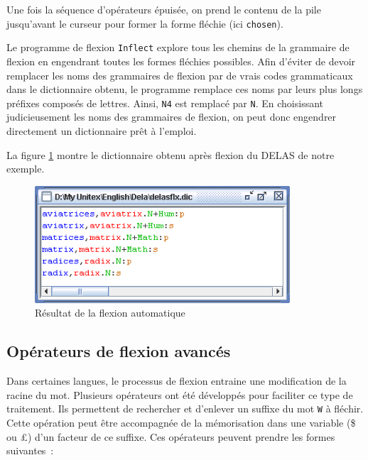 \bigskip
\noindent Une fois la séquence d’opérateurs épuisée, on prend le contenu de la pile jusqu’avant le
curseur pour former la forme fléchie (ici \verb+chosen+).

\bigskip
\noindent Le programme de flexion \verb+Inflect+ explore tous les chemins de la grammaire de flexion
en engendrant toutes les formes fléchies possibles. Afin d’éviter de devoir remplacer les noms des
grammaires de flexion par de vrais codes grammaticaux dans le dictionnaire obtenu, le programme
remplace ces noms par leurs plus longs préfixes composés de lettres. Ainsi, \verb+N4+ est remplacé
par \verb+N+. En choisissant judicieusement les noms des grammaires de flexion, on peut donc
engendrer directement un dictionnaire prêt à l’emploi.

\bigskip
\noindent La figure \ref{fig-inflection-result} montre le dictionnaire obtenu après flexion du DELAS de notre exemple.

\bigskip
\begin{figure}[!ht]
\begin{center}
\includegraphics[width=9.5cm]{resources/img/fig3-9.png}
\caption{Résultat de la flexion automatique\label{fig-inflection-result}}
\end{center}
\end{figure}
\bigskip

\subsection{Opérateurs de flexion avancés}
\label{advanced-inflection-operators}
Dans certaines langues, le processus de flexion entraine une modification de la racine du mot.
Plusieurs opérateurs ont été développés pour faciliter ce type de traitement. Ils permettent de rechercher
et d'enlever un suffixe du mot \verb+W+ \`a fléchir. Cette opération peut
\^etre accompagnée de la mémorisation dans une variable (\$ ou \pounds) d'un facteur de ce suffixe.
Ces opérateurs peuvent prendre les formes suivantes~:

